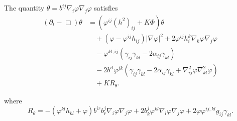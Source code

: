 \documentclass{amsart}
\begin{document}
\begin{lemma}
\label{lem:Evtheta}
The quantity $\theta = b^{ij}\nabla_i \varphi\nabla_j\varphi$ satisfies
\[
\begin{split}
(\partial_{t} - \Box)\theta &= (\varphi^{ij}(h^2)_{ij} + K\Phi)\theta \\
&\quad + (\varphi - \varphi^{ij}h_{ij})|\nabla\varphi|^{2} + 2\varphi^{ij}h^{k}_{i}\nabla_k\varphi\nabla_j\varphi \\
&\quad - \varphi^{kl,ij} (\gamma_{ij}\gamma_{kl}  - 2\alpha_{ij} \gamma_{kl}) \\
&\quad - 2b^{il} \varphi^{jk} \left(\gamma_{ij} \gamma_{kl} - 2\alpha_{ij} \gamma_{kl} + \nabla^2_{ij}\varphi\nabla^2_{kl}\varphi\right) \\
&\quad + KR_{\theta}.
\end{split}
\]
\end{lemma}
where
\[
R_{\theta} = -(\varphi^{kl}h_{kl} + \varphi)b^{ir}b^{j}_{r}\nabla_i \varphi\nabla_j\varphi + 2 b^{j}_{k}\varphi^{kl}\nabla_l\varphi\nabla_j\varphi + 2 \varphi\varphi^{ij,kl} g_{ij} \gamma_{kl}.
\]
\end{document}
